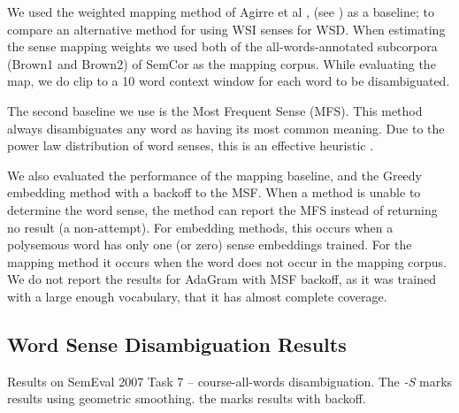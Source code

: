\documentclass{sig-alternate}
\begin{document}
We used the weighted mapping method of Agirre et al \parencite{agirre2006}, (see ) as a baseline; to compare an alternative method for using WSI senses for WSD.
When estimating the sense mapping weights we used both of the all-words-annotated subcorpora (Brown1 and Brown2) of SemCor as the mapping corpus.
While evaluating the map, we do clip to a 10 word context window for each word to be disambiguated.

The second baseline we use is the Most Frequent Sense (MFS). This method always disambiguates any word as having its  most common meaning. Due to the power law distribution of word senses, this is an effective heuristic \parencite{Kilgarriff2004}.

We also evaluated the performance of the mapping baseline, and the Greedy embedding method with a backoff to the MSF. When a method is unable to determine the word sense, the method can report the MFS instead of returning no result (a non-attempt). For embedding methods, this occurs when a polysemous word has only one (or zero) sense embeddings trained. For the mapping method it occurs when the word does not occur in the mapping corpus. We do not report the results for AdaGram with MSF backoff, as it was trained with a large enough vocabulary, that it has almost complete coverage.

\subsection{Word Sense Disambiguation Results} \label{WSDtask}
\begin{table}
	\begin{adjustbox}{max width=\columnwidth}
	\end{adjustbox}

	\caption{Results on SemEval 2007 Task 7 -- course-all-words disambiguation.
	The \emph{-S} marks results using geometric smoothing.
	the \emph{\textasteriskcentered } marks results with backoff.
	} \label{samevalres}
\end{table}
\end{document}
